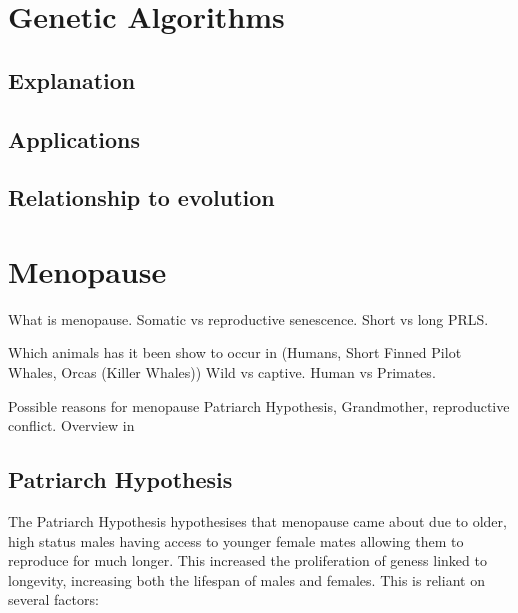 \documentclass[authoryearcitations]{UoYCSproject}
\begin{document}
\section{Genetic Algorithms}

\subsection{Explanation}

\subsection{Applications}

\subsection{Relationship to evolution}

\newpage
\section{Menopause}
What is menopause. Somatic vs reproductive senescence. Short vs long PRLS.

Which animals has it been show to occur in (Humans, Short Finned Pilot Whales, Orcas (Killer Whales)) Wild vs captive. Human vs Primates.

Possible reasons for menopause Patriarch Hypothesis, Grandmother, reproductive conflict. Overview in \cite{evolutionPRLS2015}
\newpage
\subsection{Patriarch Hypothesis}
The Patriarch Hypothesis \cite{patriarchHypothesis2000} hypothesises that menopause came about due to older, high status males having access to younger female mates allowing them to reproduce for much longer. This increased the proliferation of geness linked to longevity, increasing both the lifespan of males and females. This is reliant on several factors: 
\end{document}
